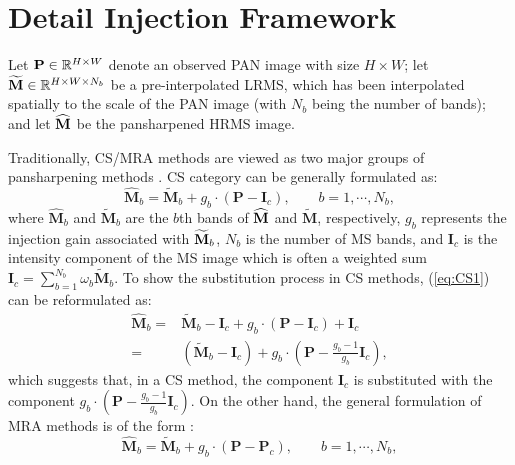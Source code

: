\documentclass[journal]{IEEEtran}
\begin{document}
\section{Detail Injection Framework} \label{sec:DetailInjection}

Let ${\bf P}\in\mathbb{R}^{H \times W}$ denote an observed PAN image with size $H \times W$; let ${\bf \widetilde{M}}\in\mathbb{R}^{H \times W\times N_b}$ be a pre-interpolated LRMS, which has been interpolated spatially to the scale of the PAN image (with $N_b$ being the number of bands); and let ${\bf\widehat{M}}$ be the pansharpened HRMS image.

Traditionally, CS/MRA methods are viewed as two major groups of pansharpening methods \cite{Survey:Vivone2015}. CS category can be generally formulated as:
\begin{equation}
   \label{eq:CS1} {\widehat {\mathbf {M}}}_b={ \widetilde {\mathbf{M}}}_b+ g_b\cdot(\mathbf{P}-\mathbf {I}_c),\:\:\:\:\:\:\:\:\: b=1,\cdots,N_b,
\end{equation}
where ${\widehat {\mathbf {M}}}_b$ and ${ \widetilde {\mathbf{M}}}_b$ are the $b$th bands of ${\bf \widehat{M}}$ and ${\widetilde {\mathbf{M}}}$, respectively, $g_b$ represents the injection gain associated with ${\bf \widetilde{M}}_b$, $N_b$ is the number of MS bands, and $\mathbf{I}_c$ is the intensity component of the MS image which is often a weighted sum $\mathbf{I}_c=\sum\limits_{b=1}^{N_b}\omega_b\widetilde {\mathbf{M}}_b$. To show the substitution process in CS methods, (\ref{eq:CS1}) can be reformulated as:
\begin{equation}
\begin{split}
   \label{eq:CS2} {\widehat {\mathbf {M}}_b}
   =&{ \widetilde {\mathbf{M}}_b-\mathbf{I}_c}+ g_b\cdot(\mathbf{P}-\mathbf{I}_c)+\mathbf{I}_c\\
   =&(\widetilde {\mathbf{M}}_b-\mathbf{I}_c)+ g_b\cdot(\mathbf{P}-\frac{g_b-1}{g_b}\mathbf{I}_c),
   \end{split}
\end{equation}
which suggests that, in a CS method, the component $\mathbf{I}_c$ is substituted with the component $g_b\cdot(\mathbf{P}-\frac{g_b-1}{g_b}\mathbf{I}_c)$.
On the other hand, the general formulation of MRA methods is of the form \cite{Survey:Vivone2015}:
\begin{equation}
   \label{eq:MRA} {\widehat {\mathbf {M}}_b}={ \widetilde {\mathbf{M}}_b}+ g_b\cdot(\mathbf{P}-\mathbf {P}_c),\:\:\:\:\:\:\:\:\: b=1,\cdots,N_b,
\end{equation}
\end{document}
